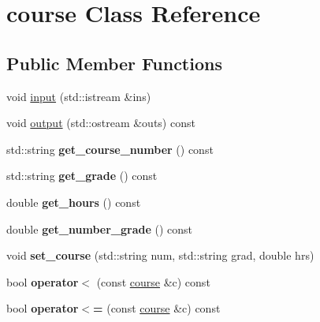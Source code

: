 \hypertarget{classcourse}{\section{course Class Reference}
\label{classcourse}
}
\subsection*{Public Member Functions}
\begin{DoxyCompactItemize}
\item 
void \hyperlink{classcourse_a0a8839f2369903101399bca60547aed2}{input} (std\-::istream \&ins)
\item 
void \hyperlink{classcourse_adf8ca7160e06644424027332c733242a}{output} (std\-::ostream \&outs) const 
\item 
\hypertarget{classcourse_af8bc5c1d6f03de72f643a3011428b979}{std\-::string {\bfseries get\-\_\-course\-\_\-number} () const }\label{classcourse_af8bc5c1d6f03de72f643a3011428b979}

\item 
\hypertarget{classcourse_a1ac5854ce76435b9f286d814e16f27bc}{std\-::string {\bfseries get\-\_\-grade} () const }\label{classcourse_a1ac5854ce76435b9f286d814e16f27bc}

\item 
\hypertarget{classcourse_a8a2b5572f9d13e3cb3fd054b66bc70ac}{double {\bfseries get\-\_\-hours} () const }\label{classcourse_a8a2b5572f9d13e3cb3fd054b66bc70ac}

\item 
\hypertarget{classcourse_a525d1dd085d0a9f77f861ec5f0b04f6c}{double {\bfseries get\-\_\-number\-\_\-grade} () const }\label{classcourse_a525d1dd085d0a9f77f861ec5f0b04f6c}

\item 
\hypertarget{classcourse_a1fce1a16efb3f07d0da5daca8005e4a6}{void {\bfseries set\-\_\-course} (std\-::string num, std\-::string grad, double hrs)}\label{classcourse_a1fce1a16efb3f07d0da5daca8005e4a6}

\item 
\hypertarget{classcourse_a1666b9203d42b2cda999d52c3fbcd342}{bool {\bfseries operator$<$} (const \hyperlink{classcourse}{course} \&c) const }\label{classcourse_a1666b9203d42b2cda999d52c3fbcd342}

\item 
\hypertarget{classcourse_a6416d3083ef57cca7ed77f260f48dc11}{bool {\bfseries operator$<$=} (const \hyperlink{classcourse}{course} \&c) const }\label{classcourse_a6416d3083ef57cca7ed77f260f48dc11}


\end{DoxyCompactItemize}
